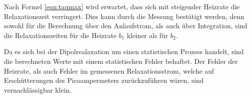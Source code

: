 Nach Formel \ref{eqn:taumax} wird erwartet, dass sich mit steigender Heizrate die Relaxationszeit verringert.
Dies kann durch die Messung bestätigt werden, denn sowohl für die Berechnung über den Anlaufstrom, als auch über
Integration, sind die Relaxationszeiten für die Heizrate $b_1$ kleiner als für $b_2$.

Da es sich bei der Dipolrealaxation um einen statistischen Prozess handelt, sind die berechneten Werte mit einem
statistischen Fehler behaftet. Der Fehler der Heizrate, als auch Fehler im gemessenen Relaxationsstrom, welche auf
Erschütterungen des Picoampermeters zurückzuführen wären, sind vernachlässigbar klein.
